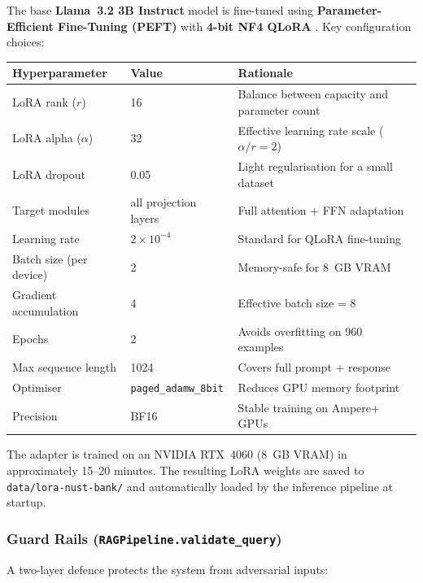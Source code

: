 \documentclass[12pt,a4paper]{article}
\begin{document}
The base \textbf{Llama~3.2 3B Instruct} model is fine-tuned using
\textbf{Parameter-Efficient Fine-Tuning (PEFT)} with \textbf{4-bit NF4 QLoRA}
\cite{dettmers2023qlora}.  Key configuration choices:

\begin{center}
\begin{tabular}{lll}
  \toprule
  Hyperparameter & Value & Rationale \\
  \midrule
  LoRA rank ($r$)            & 16      & Balance between capacity and parameter count \\
  LoRA alpha ($\alpha$)      & 32      & Effective learning rate scale ($\alpha/r = 2$) \\
  LoRA dropout               & 0.05    & Light regularisation for a small dataset \\
  Target modules             & all projection layers & Full attention + FFN adaptation \\
  Learning rate              & $2 \times 10^{-4}$ & Standard for QLoRA fine-tuning \\
  Batch size (per device)    & 2       & Memory-safe for 8~GB VRAM \\
  Gradient accumulation      & 4       & Effective batch size = 8 \\
  Epochs                     & 2       & Avoids overfitting on 960 examples \\
  Max sequence length        & 1024    & Covers full prompt + response \\
  Optimiser                  & \texttt{paged\_adamw\_8bit} & Reduces GPU memory footprint \\
  Precision                  & BF16    & Stable training on Ampere+ GPUs \\
  \bottomrule
\end{tabular}
\end{center}

The adapter is trained on an NVIDIA RTX~4060 (8~GB VRAM) in approximately
15--20 minutes.  The resulting LoRA weights are saved to
\texttt{data/lora-nust-bank/} and automatically loaded by the inference pipeline
at startup.

\subsubsection{Guard Rails (\texttt{RAGPipeline.validate\_query})}

A two-layer defence protects the system from adversarial inputs:
\end{document}
